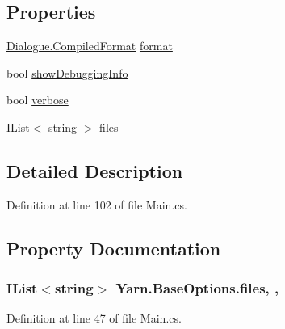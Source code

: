 \subsection*{Properties}
\begin{DoxyCompactItemize}
\item 
\hyperlink{a00082_a903f18cdcc66c28ceab5a43c41fe074d}{Dialogue.\-Compiled\-Format} \hyperlink{a00045_a9904ccfb1b0ff64df415c4fc9fe6eb1c}{format}
\item 
bool \hyperlink{a00031_a89964ea17bd19caf00cb5bff563ed01c}{show\-Debugging\-Info}
\item 
bool \hyperlink{a00031_ada4d83d1756918f362d55f6649b82b17}{verbose}
\item 
I\-List$<$ string $>$ \hyperlink{a00031_aa93cbb1bc1d5328e0a417012621e92d2}{files}
\end{DoxyCompactItemize}


\subsection{Detailed Description}


Definition at line 102 of file Main.\-cs.



\subsection{Property Documentation}
\hypertarget{a00031_aa93cbb1bc1d5328e0a417012621e92d2}{
\subsubsection[{files}]{\setlength{\rightskip}{0pt plus 5cm}I\-List$<$string$>$ Yarn.\-Base\-Options.\-files\hspace{0.3cm}{\ttfamily [get]}, {\ttfamily [set]}, {\ttfamily [inherited]}}}\label{a00031_aa93cbb1bc1d5328e0a417012621e92d2}


Definition at line 47 of file Main.\-cs.



